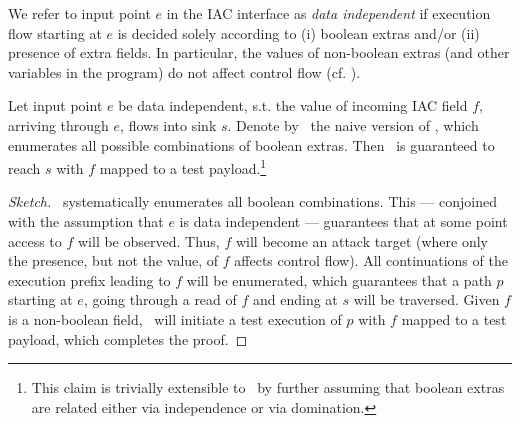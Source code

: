 \begin{definition}\label{De:dataind} We refer to input point $e$ in the IAC interface as \emph{data independent} if execution flow starting at $e$ is decided solely according to (i) boolean extras and/or (ii) presence of extra fields. In particular, the values of non-boolean extras (and other variables in the program) do not affect control flow (cf. \cite{SYGABSV:ISSTA14,W:POPL86}).
\end{definition}

\begin{theorem}[Coverage] Let input point $e$ be data independent, s.t. the value of incoming IAC field $f$, arriving through $e$, flows into sink $s$. 
	Denote by \ETool\ the naive version of \Tool, which enumerates all possible combinations of boolean extras.
	Then \ETool\ is guaranteed to reach $s$ with $f$ mapped to a test payload.\footnote{
		This claim is trivially extensible to \Tool\ by further assuming that boolean extras are related either via independence or via domination.
	}
	\begin{proof}[Sketch] \ETool\ systematically enumerates all boolean combinations. This --- conjoined with the assumption that $e$ is data independent --- guarantees that at some point access to $f$ will be observed. Thus, $f$ will become an attack target (where only the presence, but not the value, of $f$ affects control flow). All continuations of the execution prefix leading to $f$ will be enumerated, which guarantees that a path $p$ starting at $e$, going through a read of $f$ and ending at $s$ will be traversed. Given $f$ is a non-boolean field, \ETool\ will initiate a test execution of $p$ with $f$ mapped to a test payload, which completes the proof.
	\end{proof}
\end{theorem}